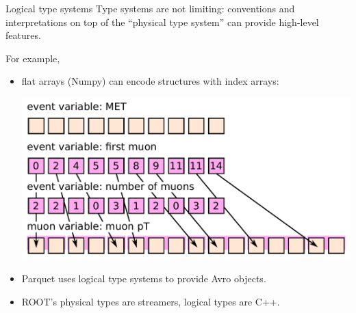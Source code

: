 \documentclass{beamer}
\begin{document}
\begin{frame}{Logical type systems}
\vspace{0.25 cm}
Type systems are not limiting: conventions and interpretations on top of the ``physical type system'' can provide high-level features.

\vspace{0.1 cm}
For example,

\begin{itemize}
\item flat arrays (Numpy) can encode structures with index arrays:

\includegraphics[width=\linewidth]{hierarchical_arrays.pdf}

\item Parquet uses logical type systems to provide Avro objects.

\item ROOT's physical types are streamers, logical types are C++.
\end{itemize}
\end{frame}

\begin{frame}{}



\end{frame}
\end{document}

